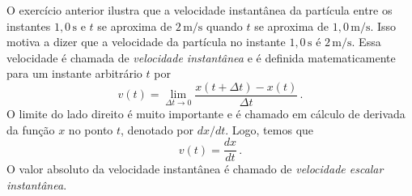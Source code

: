 \documentclass[12pt,a4paper]{article}
\theoremstyle{definition}
\begin{document}
O exercício anterior ilustra que a velocidade instantânea da partícula
entre os instantes $1{,}0\,\mathrm{s}$ e $t$ se aproxima de
$2\,\mathrm{m/s}$ quando $t$ se aproxima de
$1{,}0\,\mathrm{m/s}$. Isso motiva a dizer que a velocidade da
partícula no instante $1{,}0\,\mathrm{s}$ é $2\,\mathrm{m/s}$. Essa
velocidade é chamada de \emph{velocidade instantânea} e é definida
matematicamente para um instante arbitrário $t$ por
$$v(t)=\lim_{\Delta t\to 0}\frac{x(t+\Delta t)-x(t)}{\Delta t}\,.$$
O limite do lado direito é muito importante e é chamado em cálculo de
derivada da função $x$ no ponto $t$, denotado por $dx/dt$. Logo, temos
que
$$v(t)=\frac{dx}{dt}\,.$$
O valor absoluto da velocidade instantânea é chamado de
\emph{velocidade escalar instantânea}.
\end{document}
